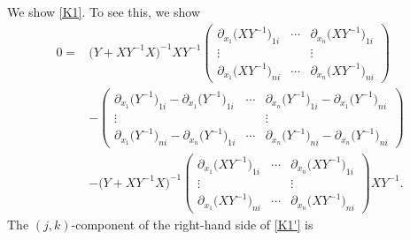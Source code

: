 \documentclass[10pt,a4paper]{amsart}
\numberwithin{equation}{section}
\begin{document}
We show \eqref{K1}. To see this, we show
\begin{align}
0={}& \bigl(Y+XY^{-1}X\bigr)^{-1}XY^{-1}
\begin{pmatrix}
\partial_{x_1}\bigl(XY^{-1}\bigr)_{1i} & \cdots & \partial_{x_n}\bigl(XY^{-1}\bigr)_{1i} \\
\vdots & & \vdots \\
\partial_{x_1}\bigl(XY^{-1}\bigr)_{ni} & \cdots & \partial_{x_n}\bigl(XY^{-1}\bigr)_{ni}
\end{pmatrix} \nonumber \\
&-
\begin{pmatrix}
\partial_{x_1}\bigl(Y^{-1}\bigr)_{1i}-\partial_{x_1}\bigl(Y^{-1}\bigr)_{1i} & \cdots & \partial_{x_n}\bigl(Y^{-1}\bigr)_{1i}-\partial_{x_1}\bigl(Y^{-1}\bigr)_{ni} \\
\vdots & & \vdots \\
\partial_{x_1}\bigl(Y^{-1}\bigr)_{ni}-\partial_{x_n}\bigl(Y^{-1}\bigr)_{1i} & \cdots & \partial_{x_n}\bigl(Y^{-1}\bigr)_{ni}-\partial_{x_n}\bigl(Y^{-1}\bigr)_{ni}
\end{pmatrix}\nonumber \\
&-\bigl(Y+XY^{-1}X\bigr)^{-1}
\begin{pmatrix}
\partial_{x_1}\bigl(XY^{-1}\bigr)_{1i} & \cdots & \partial_{x_n}\bigl(XY^{-1}\bigr)_{1i} \\
\vdots & & \vdots \\
\partial_{x_1}\bigl(XY^{-1}\bigr)_{ni} & \cdots & \partial_{x_n}\bigl(XY^{-1}\bigr)_{ni}
\end{pmatrix}XY^{-1}.\label{K1'}
\end{align}
The $(j,k)$-component of the right-hand side of \eqref{K1'} is
\end{document}
